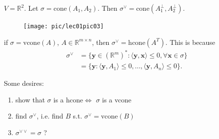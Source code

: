 \documentclass[a4paper,12pt]{amsart}
\newcommand{\RR}{\mathbb{R}}
\newcommand{\bfx}{\mathbf{x}}
\newcommand{\bfy}{\mathbf{y}}
\begin{document}
\begin{Eg}
$V=\RR^2$. Let $\sigma=\text{cone}(A_1,A_2)$. Then $\sigma^{\vee}=\text{cone}(A_1^{\perp},A_2^{\perp})$.
\begin{figure}[h]
\centering
\texttt{[image: pic/lec01pic03]}
\end{figure}
\end{Eg}
\begin{Remark}
if $\sigma=\text{vcone}(A)$, $A\in\RR^{m\times n}$, then $\sigma^{\vee}=\text{hcone}(A^{T})$. This is because
\begin{align*}
\sigma^{\vee}&=\{\bfy\in(\RR^m)^*:\langle \bfy,\bfx \rangle\leq 0,\forall \bfx\in \sigma\}\\
&=\{\bfy: \langle \bfy,A_1 \rangle\leq 0,\dots,\langle \bfy,A_n \rangle\leq 0\}.
\end{align*}
\end{Remark}
Some desires:
\begin{enumerate}
\item show that $\sigma$ is a hcone$\iff$ $\sigma$ is a vcone
\item  find $\sigma^{\vee}$, i.e. find $B$ s.t. $\sigma^{\vee}=\text{vcone}(B)$
\item $\sigma^{\vee\vee}=\sigma$ ?
\end{enumerate}
\end{document}
